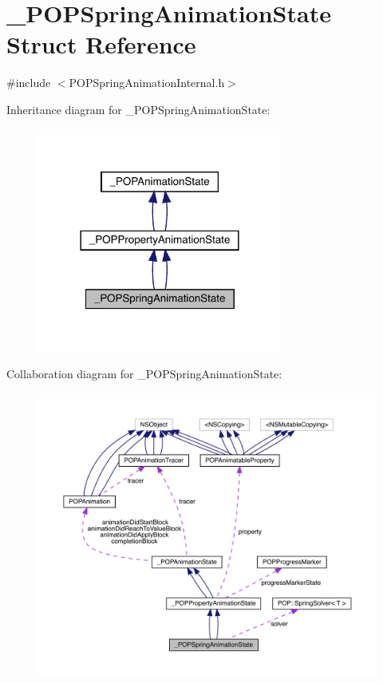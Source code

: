 \hypertarget{struct___p_o_p_spring_animation_state}{}\section{\+\_\+\+P\+O\+P\+Spring\+Animation\+State Struct Reference}
\label{struct___p_o_p_spring_animation_state}


{\ttfamily \#include $<$P\+O\+P\+Spring\+Animation\+Internal.\+h$>$}



Inheritance diagram for \+\_\+\+P\+O\+P\+Spring\+Animation\+State\+:\nopagebreak
\begin{figure}[H]
\begin{center}
\leavevmode
\includegraphics[width=228pt]{struct___p_o_p_spring_animation_state__inherit__graph}
\end{center}
\end{figure}


Collaboration diagram for \+\_\+\+P\+O\+P\+Spring\+Animation\+State\+:\nopagebreak
\begin{figure}[H]
\begin{center}
\leavevmode
\includegraphics[width=350pt]{struct___p_o_p_spring_animation_state__coll__graph}
\end{center}
\end{figure}
